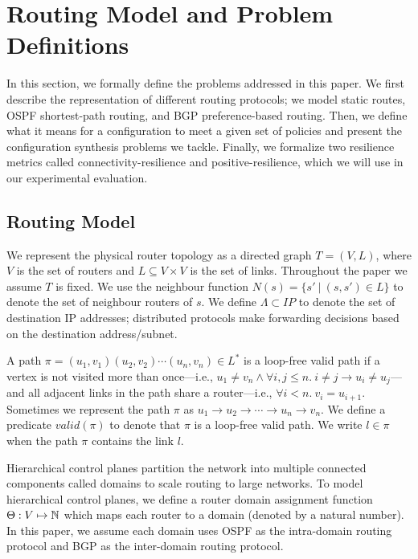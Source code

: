 \section{Routing Model and Problem Definitions}
In this section, we formally define the problems addressed in this
paper.  We first describe the representation of different
routing protocols; we model static
routes, OSPF shortest-path routing, and BGP preference-based routing.
Then, we define what it means for a configuration to meet a given
set of policies and present the configuration synthesis problems
we tackle.
Finally, we formalize two resilience metrics called 
connectivity-resilience and positive-resilience,
which we will use in our experimental evaluation.


\subsection{Routing Model} \label{sec:routingmodel}

We represent the physical router topology as a directed graph $T=(V, L)$,
where $V$ is the set of routers and $L\subseteq V\times V$ is the set of links. 
Throughout the paper we assume $T$ is fixed.
We use the neighbour function $N(s) = \{s'\ | \ (s,s') \in L \}$ to denote 
the set of neighbour routers of $s$. 
We define $\Lambda \subset IP$ to denote the set of 
destination IP addresses;
distributed protocols make forwarding decisions based on the 
destination address/subnet.

A path $\pi = (u_1,v_1) (u_2, v_2) \cdots (u_n, v_n) \in L^*$ is a 
loop-free valid path if
a  vertex is not visited more than once---i.e.,
$u_1\neq v_n\wedge\forall i,j \leq n. 
~i \not= j \rightarrow u_i \not= u_j$---and all adjacent links in the
path share a router---i.e., $\forall i < n. ~v_i = u_{i+1}$.
Sometimes we represent the path $\pi$ as $u_1\rightarrow u_2 \rightarrow  \cdots \rightarrow u_n \rightarrow v_n$.
We define a predicate $valid(\pi)$ to denote that $\pi$
is a loop-free valid path. 
We write $l \in \pi$ when the path $\pi$ contains the link $l$. 

Hierarchical control planes partition the
network into multiple connected components called domains 
to scale routing to large networks. To model hierarchical 
control planes, 
we define a router domain assignment function
$\Theta: V \mapsto \mathbb{N}$ which maps each router to a domain 
(denoted by a natural number). In this paper, we assume 
each domain uses OSPF as the intra-domain routing protocol
and BGP as the inter-domain routing protocol. 

